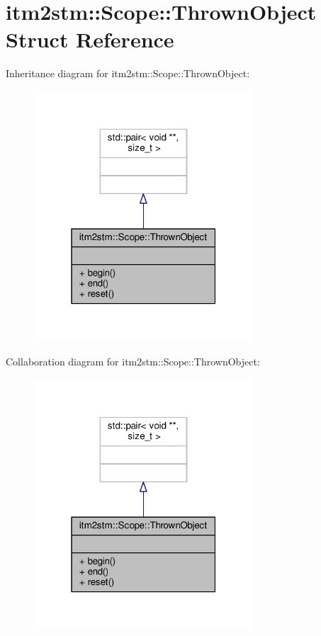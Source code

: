 \hypertarget{structitm2stm_1_1Scope_1_1ThrownObject}{\section{itm2stm\-:\-:Scope\-:\-:Thrown\-Object Struct Reference}
\label{structitm2stm_1_1Scope_1_1ThrownObject}
}


Inheritance diagram for itm2stm\-:\-:Scope\-:\-:Thrown\-Object\-:
\nopagebreak
\begin{figure}[H]
\begin{center}
\leavevmode
\includegraphics[width=232pt]{structitm2stm_1_1Scope_1_1ThrownObject__inherit__graph}
\end{center}
\end{figure}


Collaboration diagram for itm2stm\-:\-:Scope\-:\-:Thrown\-Object\-:
\nopagebreak
\begin{figure}[H]
\begin{center}
\leavevmode
\includegraphics[width=232pt]{structitm2stm_1_1Scope_1_1ThrownObject__coll__graph}
\end{center}
\end{figure}
